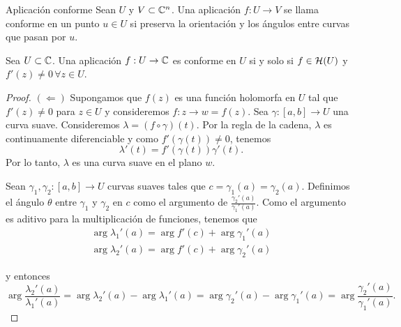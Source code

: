 \begin{definition}{Aplicación conforme}
    Sean $U$ y $V \subset \mathbb{C}^n$. Una aplicación $f: U \rightarrow V$ se llama conforme en un punto $u \in U$ si preserva la orientación y los ángulos entre curvas que pasan por $u$.
\end{definition}

\begin{prop}
    Sea $U \subset \mathbb{C}$. Una aplicación $f: U \rightarrow \mathbb{C}$ es conforme en $U$ si y solo si $f \in \mathcal{H}(U)$ y $f'(z) \not = 0 \, \forall z \in U$.
\end{prop}

\begin{proof}
    $(\Leftarrow)$ Supongamos que $f(z)$ es una función holomorfa en $U$ tal que $f'(z) \not = 0$ para $z \in U$ y consideremos $f:z \rightarrow w=f(z)$. Sea $\gamma: [a,b] \rightarrow U$ una curva suave. Consideremos $\lambda = (f \circ  \gamma)(t)$. Por la regla de la cadena, $\lambda$ es continuamente diferenciable y como $f'(\gamma(t)) \not = 0$, tenemos
    \begin{equation}
        \label{cadena}
        \lambda'(t) = f'(\gamma(t))\gamma'(t).
    \end{equation}
    Por lo tanto, $\lambda$ es una curva suave en el plano $w$.

    Sean $\gamma_1, \gamma_2: [a,b] \rightarrow U$ curvas suaves tales que $c=\gamma_1(a) = \gamma_2(a)$. Definimos el ángulo $\theta$ entre $\gamma_1$ y $\gamma_2$ en $c$ como el argumento de $\frac{\gamma_2'(a)}{\gamma_1'(a)}$. Como el argumento es aditivo para la multiplicación de funciones, tenemos que
    \begin{equation*}
    \begin{split}
        \arg \lambda_1'(a) = \arg f'(c) + \arg \gamma_1'(a)\\
        \arg \lambda_2'(a) = \arg f'(c) + \arg \gamma_2'(a)
    \end{split}
    \end{equation*}

    y entonces
    \begin{equation*}
        \arg  \frac{\lambda_2'(a)}{\lambda_1'(a)} = \arg \lambda_2'(a) - \arg \lambda_1'(a) = \arg \gamma_2'(a) - \arg \gamma_1'(a) = \arg  \frac{\gamma_2'(a)}{\gamma_1'(a)}.
    \end{equation*}


\end{proof}
